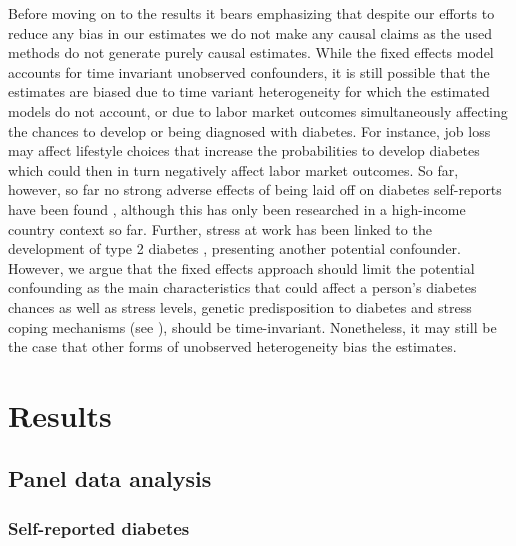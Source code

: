 \documentclass[12pt,english,british]{article}
\begin{document}
Before moving on to the results it bears emphasizing that despite our efforts to reduce any bias in our estimates we do not make any causal claims as the used methods do not generate purely causal estimates. While the fixed effects model accounts for time invariant
unobserved confounders, it is still possible that the estimates are biased
due to time variant heterogeneity for which the estimated models do not account, or
due to labor market outcomes simultaneously affecting the chances to develop or
being diagnosed with diabetes. For instance, job loss may affect lifestyle choices that increase the probabilities to develop
diabetes which could then in turn negatively affect labor market outcomes. So far, however, so far no strong adverse effects of being laid
off on diabetes self-reports have been found \citep{Bergemann2011,Schaller2015},
although this has only been researched in a high-income country context so far.  Further, stress at work has been linked to the development of type 2 diabetes \citep{Heraclides2012,Eriksson2013}, presenting another potential confounder. However, we argue that the fixed effects approach should limit the potential confounding as the main characteristics that could affect a person's diabetes chances as well as stress levels, genetic predisposition to diabetes and stress coping mechanisms (see \citet{Schneiderman2005}), should be time-invariant. Nonetheless, it may still be the case that other forms of unobserved heterogeneity bias the estimates.


\section{\label{sec:RESULTS} Results}


\subsection{Panel data analysis}

\subsubsection*{Self-reported diabetes}
\end{document}
